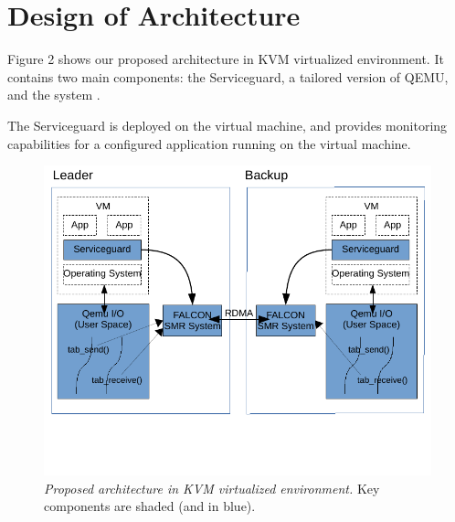 \section{Design of Architecture} \label{sec:overview}

Figure 2 shows our proposed architecture in KVM virtualized environment. 
It contains two main components: the Serviceguard, a tailored version 
of QEMU, and the \smr system \smrsystem .

The Serviceguard is deployed on the virtual machine, and provides monitoring 
capabilities for a configured application running on the virtual machine. 

\begin{figure}[t]
\centering
\includegraphics[width=.47\textwidth]{figures/arch}
\vspace{-.2in}
\caption{{\em Proposed architecture in KVM virtualized environment.} Key components are shaded (and
in blue).} \label{fig:arc}
\vspace{.05in}
\end{figure}

